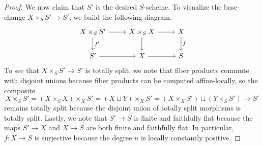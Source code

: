\documentclass{amsart}
\begin{document}
\begin{proof}
    We now claim that $S'$ is the desired $S$-scheme. To visualize the base-change $X\times_SS'\to S'$, we build the following diagram.
    \[\begin{tikzcd}
        {X\times_SS'} & {X\times_SX} & X \\
        {S'} & X & S
        \arrow["f", from=1-3, to=2-3]
        \arrow["{f'}", from=1-1, to=2-1]
        \arrow[from=1-2, to=2-2]
        \arrow[from=1-1, to=1-2]
        \arrow[from=1-2, to=1-3]
        \arrow[from=2-2, to=2-3]
        \arrow[from=2-1, to=2-2]
    \end{tikzcd}\]
    To see that $X\times_SS'\to S'$ is totally split, we note that fiber products commute with disjoint unions because fiber products can be computed affine-locally, so the composite
    \[X\times_SS'=(X\times_SX)\times_XS'=(X\sqcup Y)\times_XS'=(X\times_XS')\sqcup(Y\times_SS')\to S'\]
    remains totally split because the disjoint union of totally split morphisms is totally split. Lastly, we note that $S'\to S$ is finite and faithfully flat because the maps $S'\to X$ and $X\to S$ are both finite and faithfully flat. In particular, $f\colon X\to S$ is surjective because the degree $n$ is locally constantly positive.
\end{proof}
\end{document}
